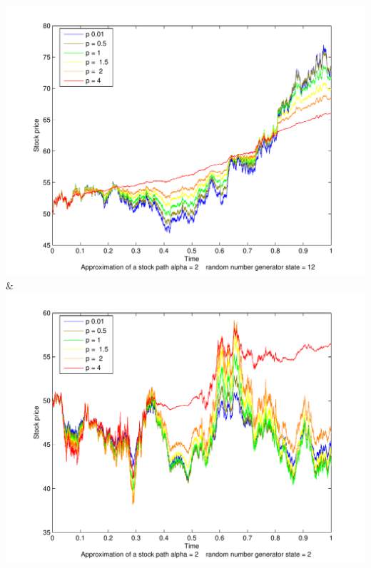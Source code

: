 \documentclass[a4paper,onecolumn]{IEEEtran}
\begin{document}
{		 \includegraphics[width=\stockplotsize]{stock_alpha2}&
			\includegraphics[width=\stockplotsize]{stock_s2_a2}\LL
			}
		
\end{document}
